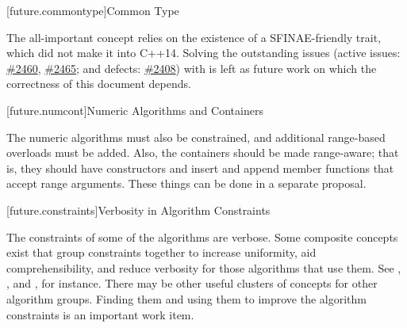 [future.commontype]{Common Type}

\pnum
The all-important  concept relies on the existence of a SFINAE-friendly
 trait, which did not make it into C++14. Solving the outstanding issues
(active issues:
\href{https://cplusplus.github.io/LWG/lwg-active.html#2460}{\#2460},
\href{https://cplusplus.github.io/LWG/lwg-active.html#2465}{\#2465}; and defects:
\href{https://cplusplus.github.io/LWG/lwg-defects.html#2408}{\#2408}) with  is
left as future work on which the correctness of this document depends.

[future.numcont]{Numeric Algorithms and Containers}

\pnum
The numeric algorithms must also be constrained, and additional range-based overloads must be added.
Also, the containers should be made range-aware; that is, they should have constructors and insert
and append member functions that accept range arguments. These things can be done in a separate
proposal.


[future.constraints]{Verbosity in Algorithm Constraints}

\pnum
The constraints of some of the algorithms are verbose. Some composite concepts exist that group
constraints together to increase uniformity, aid comprehensibility, and reduce verbosity for those
algorithms that use them. See , , and , for
instance. There may be other useful clusters of concepts for other algorithm groups. Finding them
and using them to improve the algorithm constraints is an important work item.
